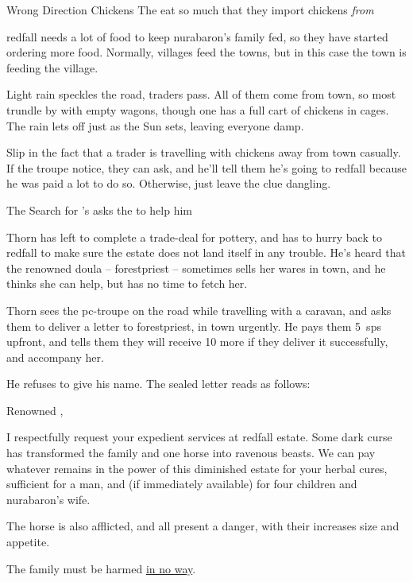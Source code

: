 {Wrong Direction Chickens}%
{The   eat so much that they import chickens \emph{from} }%

\Gls{redfall} needs a lot of food to keep \gls{nurabaron}'s family fed, so they have started ordering more food.
Normally, \glspl{village} feed the towns, but in this case the town is feeding the village.

\begin{boxtext}
  Light rain speckles the road, traders pass.
  All of them come from \gls{town}, so most trundle by with empty wagons, though one has a full cart of chickens in cages.
  The rain lets off just as the Sun sets, leaving everyone damp.
\end{boxtext}

Slip in the fact that a trader is travelling with chickens away from \gls{town} casually.
If the troupe notice, they can ask, and he'll tell them he's going to \gls{redfall} because he was paid a lot to do so.
Otherwise, just leave the clue dangling.

{The Search for }%
{'s  asks the  to help him}%
\label{nonstarter}

\begin{exampletext}
  Thorn has left to complete a trade-deal for pottery, and has to hurry back to \gls{redfall} to make sure the estate does not land itself in any trouble.
  He's heard that the renowned \gls{doula} -- \gls{forestpriest} -- sometimes sells her wares in \gls{town}, and he thinks she can help, but has no time to fetch her.
\end{exampletext}

Thorn sees the \gls{pc}-troupe on the road while travelling with a caravan, and asks them to deliver a letter to \gls{forestpriest}, in \gls{town} urgently.
He pays them 5~\glspl{sp} upfront, and tells them they will receive 10 more if they deliver it successfully, and accompany her.

He refuses to give his name.
The sealed letter reads as follows:

\begin{speechtext}
  Renowned ,

  I respectfully request your expedient services at \gls{redfall} estate.
  Some dark curse has transformed the family and one horse into ravenous beasts.
  We can pay whatever remains in the power of this diminished estate for your herbal cures, sufficient for a man, and (if immediately available) for four children and \gls{nurabaron}'s wife.

  The horse is also afflicted, and all present a danger, with their increases size and appetite.

  The family must be harmed \underline{in no way}.
\end{speechtext}

